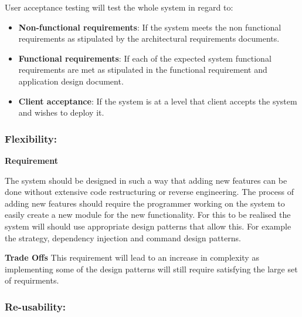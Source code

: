 \begin{flushleft}
\begin{itemize}
\end{itemize}

User acceptance testing will test the whole system in regard to:
\begin{itemize}

\item\textbf{Non-functional requirements}: If the system meets the non functional requirements as stipulated by the architectural requirements documents.
\item\textbf{Functional requirements}: If each of the expected system functional requirements are met as stipulated in the functional requirement and application design document.
\item\textbf{Client acceptance}: If the system is at a level that client accepts the system and wishes to deploy it.

\end{itemize}

\end{flushleft}

\subsubsection{Flexibility:}

\begin{flushleft}
\vspace{0.1in}

\textbf{Requirement}

The system should be designed in such a way that adding new features can be done without extensive code restructuring or reverse engineering. The process of adding new features should require the programmer working on the system to easily create a new module for the new functionality. For this to be realised the system will should use appropriate design patterns that allow this. For example the strategy, dependency injection and command design patterns. 
\vspace{0.1in}

\textbf{Trade Offs}
This requirement will lead to an increase in complexity as implementing some of the design patterns will still require satisfying the large set of requirments.

\vspace{0.1in}

\end{flushleft}


\subsubsection{Re-usability:}

